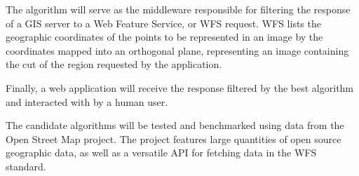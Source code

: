 \documentclass[twocolumn, 9pt]{article}
\makeatletter
\renewcommand\section{\@startsection {section}{1}{\z@}%
                                   {-2\baselineskip}%
                                   {.14in}%
                                   {\hspace{-1em}\large\textbf}}
\makeatother
\begin{document}
The algorithm will serve as the middleware responsible for filtering the response of a GIS server to a Web Feature Service, or WFS request. WFS lists the geographic coordinates of the points to be represented in an image by the coordinates mapped into an orthogonal plane, representing an image containing the cut of the region requested by the application.

Finally, a web application will receive the response filtered by the best algorithm  and interacted with by a human user. 

The candidate algorithms will be tested and benchmarked using data from the Open Street Map project. The project features large quantities of open source geographic data, as well as a versatile API for fetching data in the WFS standard.












%
\quad
\end{document}

